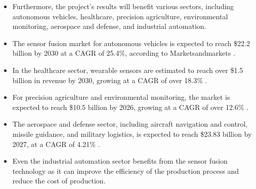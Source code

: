 \documentclass[rnd]{mas_proposal}
\begin{document}
\begin{itemize}
    \item Furthermore, the project's results will benefit various sectors, including autonomous vehicles, healthcare, precision agriculture, environmental monitoring, aerospace and defense, and industrial automation.

    \item The sensor fusion market for autonomous vehicles is expected to reach \$22.2 billion by 2030 at a CAGR of 25.4\%, according to Marketsandmarkets \cite{marketsandmarkets}.

    \item In the healthcare sector, wearable sensors are estimated to reach over \$1.5 billion in revenue by 2030, growing at a CAGR of over 18.3\% \cite{straitsresearch2021}.

    \item For precision agriculture and environmental monitoring, the market is expected to reach \$10.5 billion by 2026, growing at a CAGR of over 12.6\% \cite{mordorintelligence2023}.

    \item The aerospace and defense sector, including aircraft navigation and control, missile guidance, and military logistics, is expected to reach \$23.83 billion by 2027, at a CAGR of 4.21\% \cite{fortunebusinessinsights2023}.

    \item Even the industrial automation sector benefits from the sensor fusion technology as it can improve the efficiency of the production process and reduce the cost of production.








\end{itemize}
\end{document}
